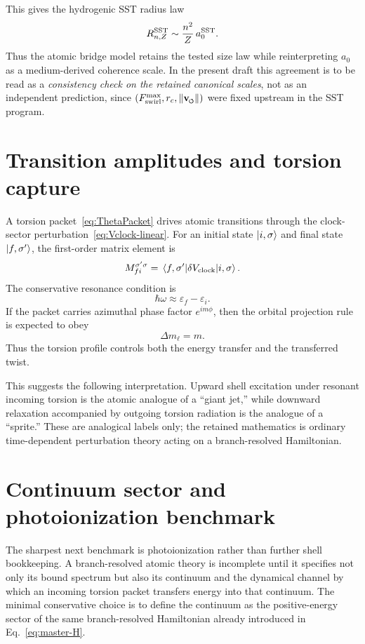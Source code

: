 \documentclass[11pt,a4paper]{article}
\newcommand{\swirlarrow}{\mathchoice{\mkern-2mu\scriptstyle\boldsymbol{\circlearrowleft}}{\mkern-2mu\scriptstyle\boldsymbol{\circlearrowleft}}{\mkern-2mu\scriptscriptstyle\boldsymbol{\circlearrowleft}}{\mkern-2mu\scriptscriptstyle\boldsymbol{\circlearrowleft}}}
\newcommand{\vswirl}{\mathbf{v}_{\swirlarrow}}
\newcommand{\rc}{r_c}
\begin{document}
This gives the hydrogenic SST radius law
\begin{equation}
\label{eq:RnZ}
R_{n,Z}^{\rm SST}\sim \frac{n^2}{Z}\,a_0^{\rm SST}.
\end{equation}
Thus the atomic bridge model retains the tested size law while reinterpreting $a_0$ as a medium-derived coherence scale. In the present draft this agreement is to be read as a \emph{consistency check on the retained canonical scales}, not as an independent prediction, since $(F_{\rm swirl}^{\max},\rc,\lVert\vswirl\rVert)$ were fixed upstream in the SST program.

\section{Transition amplitudes and torsion capture}
A torsion packet~\eqref{eq:ThetaPacket} drives atomic transitions through the clock-sector perturbation~\eqref{eq:Vclock-linear}. For an initial state $\ket{i,\sigma}$ and final state $\ket{f,\sigma'}$, the first-order matrix element is
\begin{equation}
\label{eq:Mfi}
M_{fi}^{\sigma'\sigma}=\matrixel{f,\sigma'}{\delta V_{\rm clock}}{i,\sigma}.
\end{equation}
The conservative resonance condition is
\begin{equation}
\label{eq:resonance}
\hbar\omega \approx \varepsilon_f-\varepsilon_i.
\end{equation}
If the packet carries azimuthal phase factor $e^{im\phi}$, then the orbital projection rule is expected to obey
\begin{equation}
\label{eq:dm}
\Delta m_\ell = m.
\end{equation}
Thus the torsion profile controls both the energy transfer and the transferred twist.

This suggests the following interpretation. Upward shell excitation under resonant incoming torsion is the atomic analogue of a ``giant jet,'' while downward relaxation accompanied by outgoing torsion radiation is the analogue of a ``sprite.'' These are analogical labels only; the retained mathematics is ordinary time-dependent perturbation theory acting on a branch-resolved Hamiltonian.

\section{Continuum sector and photoionization benchmark}
The sharpest next benchmark is photoionization rather than further shell bookkeeping. A branch-resolved atomic theory is incomplete until it specifies not only its bound spectrum but also its continuum and the dynamical channel by which an incoming torsion packet transfers energy into that continuum. The minimal conservative choice is to define the continuum as the positive-energy sector of the same branch-resolved Hamiltonian already introduced in Eq.~\eqref{eq:master-H}.
\end{document}
